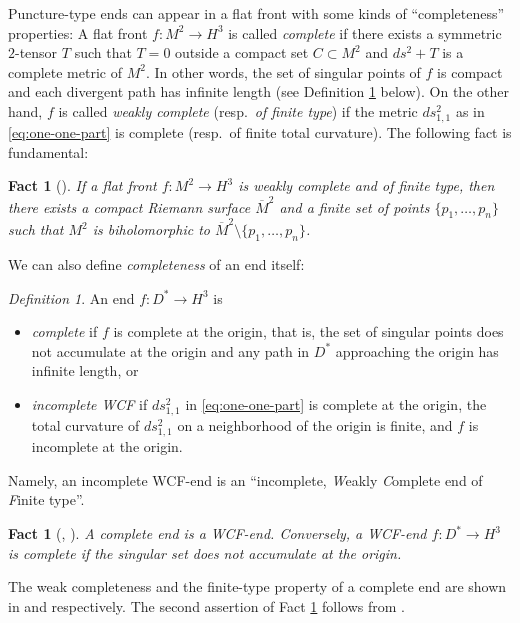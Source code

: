 \documentclass[a4paper]{amsart}
\theoremstyle{plain}
\newtheorem{fact}[theorem]{Fact}
\theoremstyle{remark}
\newtheorem{definition}[theorem]{Definition}
\numberwithin{equation}{section}
\begin{document}
Puncture-type ends can appear in a flat front 
with some kinds of ``completeness'' properties:
A flat front $f\colon{}M^2 \to H^3$ is called {\em complete\/} if
there exists a symmetric $2$-tensor $T$ such that 
$T=0$ outside a compact set $C\subset M^2$ and $ds^2+T$ 
is a complete metric of $M^2$.
In other words, the set of singular points of $f$ is compact and
each divergent path has infinite length (see Definition 
\ref{def:complete} below).  
On the other hand, $f$ is called {\em weakly complete\/} 
(resp.\ {\em of finite type}) if the metric $ds^2_{1,1}$
as in \eqref{eq:one-one-part} is complete 
(resp.\ of finite total curvature).
The following fact is fundamental:
\begin{fact}[{\cite[Proposition 3.2]{KRUY}}]\label{fact:finite-top}
 If a flat front $f\colon{}M^2\to H^3$ 
 is  weakly complete and of finite type, 
 then there exists a compact Riemann surface $\overline M^2$
 and a finite set of points $\{p_1,\dots,p_n\}$
 such that $M^2$ is biholomorphic to
 $\overline{M}^2 \setminus \{p_1,\dots,p_n\}$.
\end{fact}
We can also define {\it completeness} of an end itself: 
\begin{definition}\label{def:complete}
 An end $f\colon{}D^*\to H^3$ is 
\begin{itemize}
 \item  {\em complete\/}
	if $f$ is complete at the origin,
	that is, the set of singular points 
	does not accumulate at the origin and 
	any path in $D^*$ approaching the origin has infinite length,
	or
 \item  {\em incomplete WCF\/}
	if $ds^2_{1,1}$ in \eqref{eq:one-one-part} is  complete
	at the origin, the total curvature of $ds^2_{1,1}$ 
	on a neighborhood of the origin is finite,
	and $f$ is incomplete at the origin.
\end{itemize} 
Namely, an incomplete WCF-end is an ``incomplete, 
{\it W}eakly {\it C}omplete
end of {\it F}inite type''.
\end{definition}

\begin{fact}[{\cite{KUY2}, \cite[Proposition 3.1]{KRUY}}]\label{fact:complete}
 A complete end is a WCF-end.
 Conversely, a WCF-end $f\colon D^*\to H^3$
 is complete if the  singular set 
 does not accumulate at the origin.
\end{fact}
The weak completeness and the finite-type property of
a complete end are shown in \cite[Corollary 3.4]{KUY2} and 
\cite[Proposition 3.1]{KRUY} respectively.
The second assertion of Fact 
\ref{fact:complete} follows from
\cite[Theorem 3.3]{KRUY}.
\end{document}
